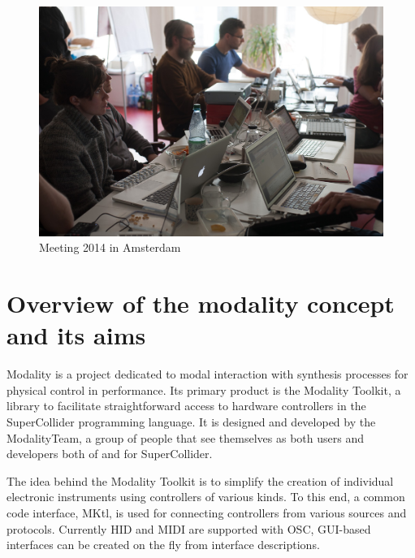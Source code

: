 \documentclass{article}
\title{\papertitle}
\begin{document}
%
\capstartfalse
\maketitle
\capstarttrue
%
\begin{abstract}
	Modality is a toolkit to improve and facilitate the use of digital technology within sound art and music, based on the audio programming language SuperCollider.
\end{abstract}

\begin{figure}[h]
	\centering
		\includegraphics[width=.9\columnwidth]{../media/20140331-IMG_5976.jpg}
	\caption{Meeting 2014 in Amsterdam}
	\label{fig:media_20140331-IMG_5976}
\end{figure}

\section{Overview of the modality concept and its aims}
\label{sec:overview_of_modality_concept_and_aims}

Modality is a project dedicated to modal interaction with synthesis processes for physical control in performance. Its primary product is the Modality Toolkit, a library to facilitate straightforward access to hardware controllers in the SuperCollider programming language. It is designed and developed by the ModalityTeam, a group of people that see themselves as both users and developers both of and for SuperCollider.

The idea behind the Modality Toolkit is to simplify the creation of individual electronic instruments using controllers of various kinds. 
To this end, a common code interface, MKtl, is used for connecting controllers from various sources and protocols. 
Currently HID and MIDI are supported with OSC, GUI-based interfaces can be created on the fly from interface descriptions.
\end{document}
